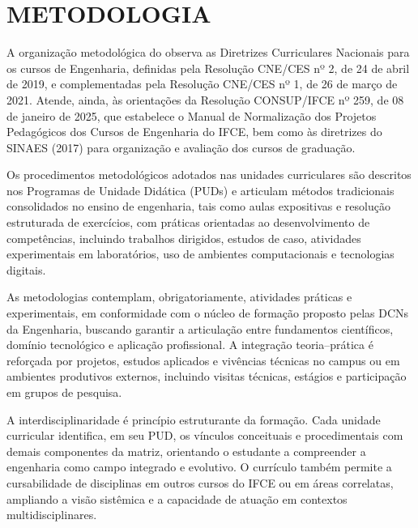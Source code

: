 
%




\section{METODOLOGIA}

A organização metodológica do \NOMECURSO observa as Diretrizes Curriculares Nacionais para os cursos de Engenharia, definidas pela Resolução CNE/CES nº 2, de 24 de abril de 2019, e complementadas pela Resolução CNE/CES nº 1, de 26 de março de 2021. Atende, ainda, às orientações da Resolução CONSUP/IFCE nº 259, de 08 de janeiro de 2025, que estabelece o Manual de Normalização dos Projetos Pedagógicos dos Cursos de Engenharia do IFCE, bem como às diretrizes do SINAES (2017) para organização e avaliação dos cursos de graduação.

Os procedimentos metodológicos adotados nas unidades curriculares são descritos nos Programas de Unidade Didática (PUDs) e articulam métodos tradicionais consolidados no ensino de engenharia, tais como aulas expositivas e resolução estruturada de exercícios, com práticas orientadas ao desenvolvimento de competências, incluindo trabalhos dirigidos, estudos de caso, atividades experimentais em laboratórios, uso de ambientes computacionais e tecnologias digitais.

As metodologias contemplam, obrigatoriamente, atividades práticas e experimentais, em conformidade com o núcleo de formação proposto pelas DCNs da Engenharia, buscando garantir a articulação entre fundamentos científicos, domínio tecnológico e aplicação profissional. A integração teoria–prática é reforçada por projetos, estudos aplicados e vivências técnicas no campus ou em ambientes produtivos externos, incluindo visitas técnicas, estágios e participação em grupos de pesquisa.

A interdisciplinaridade é princípio estruturante da formação. Cada unidade curricular identifica, em seu PUD, os vínculos conceituais e procedimentais com demais componentes da matriz, orientando o estudante a compreender a engenharia como campo integrado e evolutivo. O currículo também permite a cursabilidade de disciplinas em outros cursos do IFCE ou em áreas correlatas, ampliando a visão sistêmica e a capacidade de atuação em contextos multidisciplinares.

